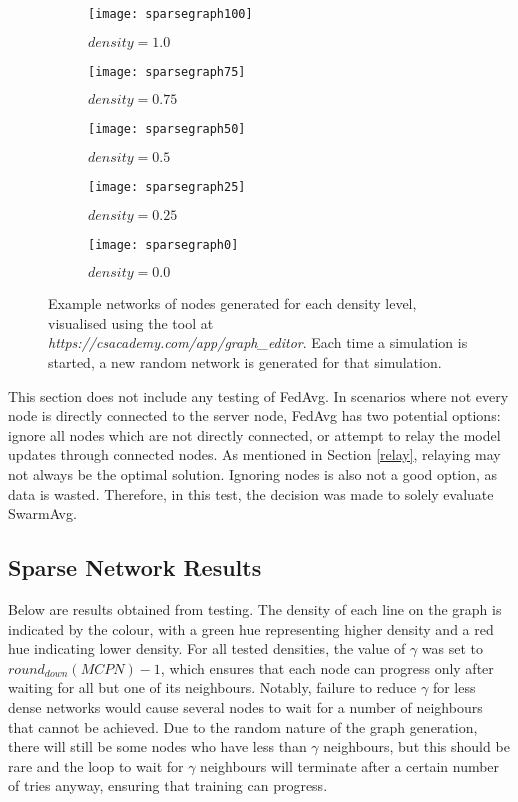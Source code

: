 \begin{figure}[H]
	\centering
	\begin{subfigure}[b]{0.3\textwidth}
		\centering
		\texttt{[image: sparsegraph100]}
		\caption{$density=1.0$}
	\end{subfigure}
	\begin{subfigure}[b]{0.3\textwidth}
		\centering
		\texttt{[image: sparsegraph75]}
		\caption{$density=0.75$}
	\end{subfigure}
	\begin{subfigure}[b]{0.3\textwidth}
		\centering
		\texttt{[image: sparsegraph50]}
		\caption{$density=0.5$}
	\end{subfigure}
	\begin{subfigure}[b]{0.3\textwidth}
		\centering
		\texttt{[image: sparsegraph25]}
		\caption{$density=0.25$}
	\end{subfigure}
	\begin{subfigure}[b]{0.3\textwidth}
		\centering
		\texttt{[image: sparsegraph0]}
		\caption{$density=0.0$}
	\end{subfigure}
	\caption{Example networks of nodes generated for each density level, visualised using the tool at \emph{https://csacademy.com/app/graph\_editor}. Each time a simulation is started, a new random network is generated for that simulation. \label{densefig}}
{}\end{figure}


This section does not include any testing of FedAvg. In scenarios where not every node is directly connected to the server node, FedAvg has two potential options: ignore all nodes which are not directly connected, or attempt to relay the model updates through connected nodes. As mentioned in Section \ref{relay}, relaying may not always be the optimal solution. Ignoring nodes is also not a good option, as data is wasted. Therefore, in this test, the decision was made to solely evaluate SwarmAvg.


\subsection{Sparse Network Results}
Below are results obtained from testing. The density of each line on the graph is indicated by the colour, with a green hue representing higher density and a red hue indicating lower density. For all tested densities, the value of $\gamma$ was set to $round_{down}(MCPN) - 1$, which ensures that each node can progress only after waiting for all but one of its neighbours. Notably, failure to reduce $\gamma$ for less dense networks would cause several nodes to wait for a number of neighbours that cannot be achieved. Due to the random nature of the graph generation, there will still be some nodes who have less than $\gamma$ neighbours, but this should be rare and the loop to wait for $\gamma$ neighbours will terminate after a certain number of tries anyway, ensuring that training can progress.


